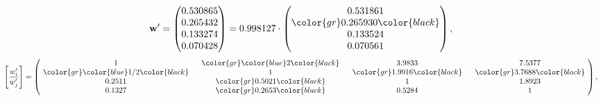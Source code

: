\begin{example}
\begin{equation*}
\mathbf{w}^{\prime} =
\begin{pmatrix}
0.530865\\
0.265432\\
0.133274\\
0.070428
\end{pmatrix} =
0.998127\cdot
\begin{pmatrix}
0.531861\\
\color{gr} 0.265930\color{black} \\
0.133524\\
0.070561
\end{pmatrix},
\end{equation*}
\begin{equation*}
\left[ \frac{{w}^{\prime}_i}{{w}^{\prime}_j} \right] =
\begin{pmatrix}
$\,\,$ 1 $\,\,$ & $\,\,$\color{gr} \color{blue} 2\color{black} $\,\,$ & $\,\,$3.9833$\,\,$ & $\,\,$7.5377$\,\,$ \\
$\,\,$\color{gr} \color{blue}  1/2\color{black} $\,\,$ & $\,\,$ 1 $\,\,$ & $\,\,$\color{gr} 1.9916\color{black} $\,\,$ & $\,\,$\color{gr} 3.7688\color{black}   $\,\,$ \\
$\,\,$0.2511$\,\,$ & $\,\,$\color{gr} 0.5021\color{black} $\,\,$ & $\,\,$ 1 $\,\,$ & $\,\,$1.8923 $\,\,$ \\
$\,\,$0.1327$\,\,$ & $\,\,$\color{gr} 0.2653\color{black} $\,\,$ & $\,\,$0.5284$\,\,$ & $\,\,$ 1  $\,\,$ \\
\end{pmatrix},
\end{equation*}
\end{example}
\newpage
